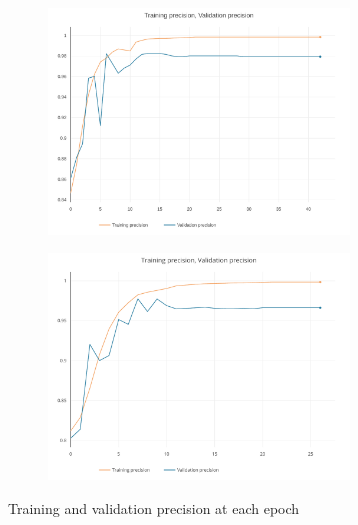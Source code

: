 \documentclass[journal]{IEEEtran}
\begin{document}
\begin{figure}[h]
	\centering

	\begin{subfigure}{0.49\textwidth}
		\centering
		\includegraphics[height = 6cm]{Images/precision.pdf}
	\end{subfigure}
	\hspace{1mm}
	\begin{subfigure}{0.49\textwidth}
		\centering
		\includegraphics[height = 6cm]{Images/precision1.pdf}
	\end{subfigure}
	
	\caption{Training and validation precision at each epoch}
\end{figure}
\end{document}
